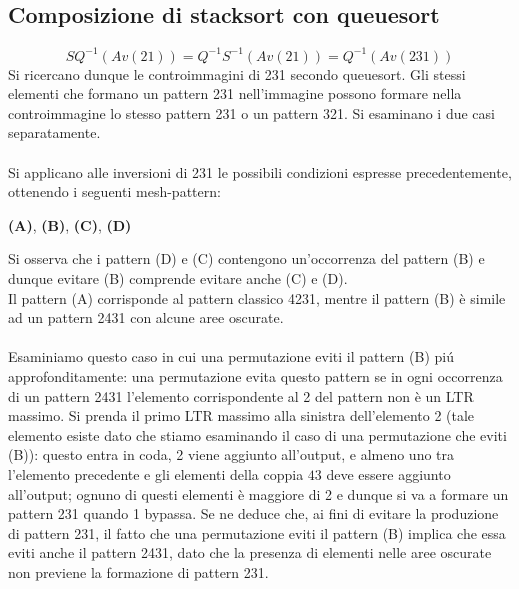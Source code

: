 \subsection*{Composizione di {stacksort} con {queuesort}}
$$SQ^{-1}(Av(21)) = Q^{-1}S^{-1}(Av(21)) = Q^{-1}(Av(231))$$
Si ricercano dunque le controimmagini di 231 secondo queuesort. Gli stessi elementi che formano un pattern 231 nell'immagine possono formare nella controimmagine lo stesso pattern 231 o un pattern 321. Si esaminano i due casi separatamente.\\\\
Si applicano alle inversioni di 231 le possibili condizioni espresse precedentemente, ottenendo i seguenti mesh-pattern:
\begin{center}
\textbf{(A)},
\textbf{(B)},
\textbf{(C)},
\textbf{(D)}
\end{center}
Si osserva che i pattern (D) e (C) contengono un'occorrenza del pattern (B) e dunque evitare (B) comprende evitare anche (C) e (D).\\
Il pattern (A) corrisponde al pattern classico 4231, mentre il pattern (B) \`e simile ad un pattern 2431 con alcune aree oscurate.\\\\
Esaminiamo questo caso in cui una permutazione eviti il pattern (B) pi\'u approfonditamente: una permutazione evita questo pattern se in ogni occorrenza di un pattern 2431 l'elemento corrispondente al 2 del pattern non \`e un LTR massimo. Si prenda il primo LTR massimo alla sinistra dell'elemento 2 (tale elemento esiste dato che stiamo esaminando il caso  di una permutazione che eviti (B)): questo entra in coda, 2 viene aggiunto all'output, e almeno uno tra l'elemento precedente e gli elementi della coppia $43$ deve essere aggiunto all'output; ognuno di questi elementi \`e maggiore di 2 e dunque si va a formare un pattern 231 quando 1 bypassa. Se ne deduce che, ai fini di evitare la produzione di pattern 231, il fatto che una permutazione eviti il pattern (B) implica che essa eviti anche il pattern 2431, dato che la presenza di elementi nelle aree oscurate non previene la formazione di pattern 231.\\\\
